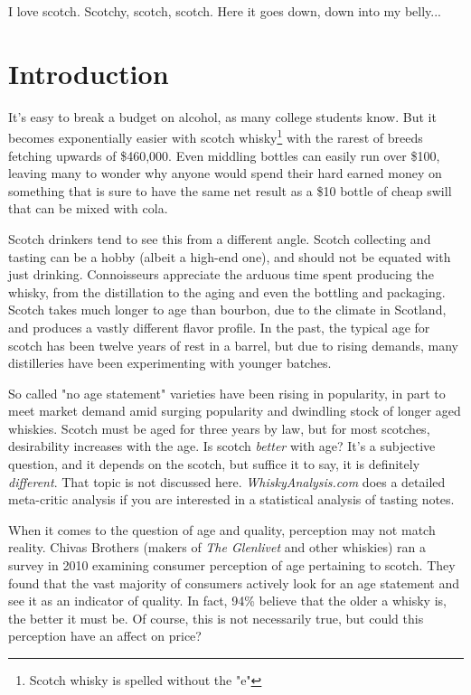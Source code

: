 
\begin{savequote}[45mm]
I love scotch. Scotchy, scotch, scotch. Here it goes down, down into my belly... 
\end{savequote}

\chapter{Introduction}

It's easy to break a budget on alcohol, as many college students know. But it becomes exponentially easier with scotch whisky\footnote{Scotch whisky is spelled without the "e"} with the rarest of breeds fetching upwards of \$460,000.\cite{Macallan64} Even middling bottles can easily run over \$100, leaving many to wonder why anyone would spend their hard earned money on something that is sure to have the same net result as a \$10 bottle of cheap swill that can be mixed with cola.

Scotch drinkers tend to see this from a different angle. Scotch collecting and tasting can be a hobby (albeit a high-end one), and should not be equated with just drinking. Connoisseurs appreciate the arduous time spent producing the whisky, from the distillation to the aging and even the bottling and packaging. Scotch takes much longer to age than bourbon, due to the climate in Scotland, and produces a vastly different flavor profile. In the past, the typical age for scotch has been twelve years of rest in a barrel, but due to rising demands, many distilleries have been experimenting with younger batches. 

So called "no age statement" varieties have been rising in popularity, in part to meet market demand amid surging popularity and dwindling stock of longer aged whiskies. Scotch must be aged for three years by law, but for most scotches, desirability increases with the age. Is scotch \textit{better} with age? It's a subjective question, and it depends on the scotch, but suffice it to say, it is definitely \textit{different}. That topic is not discussed here. \textit{WhiskyAnalysis.com} does a detailed meta-critic analysis if you are interested in a statistical analysis of tasting notes. \cite{WhiskyAnalysis}

When it comes to the question of age and quality, perception may not match reality. Chivas Brothers (makers of \textit{The Glenlivet} and other whiskies) ran a survey in 2010 examining consumer perception of age pertaining to scotch. They found that the vast majority of consumers actively look for an age statement and see it as an indicator of quality. In fact, 94\% believe that the older a whisky is, the better it must be. \cite{Chivas} Of course, this is not necessarily true, but could this perception have an affect on price?

